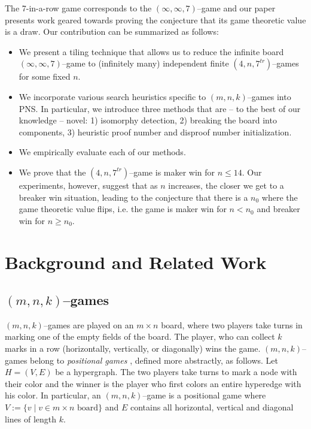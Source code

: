 \documentclass[conference]{IEEEtran}
\theoremstyle{definition}
\begin{document}
The 7-in-a-row game corresponds to the $(\infty, \infty, 7)$--game and our paper presents work geared towards proving the conjecture that its game theoretic value is a draw. Our contribution can be summarized as follows:
\begin{itemize}
    \item We present a tiling technique that allows us to reduce the infinite board $(\infty,\infty,7)$--game to (infinitely many) independent finite $(4,n,7^{tr})$--games for some fixed $n$.
    \item We incorporate various search heuristics specific to $(m,n,k)$--games into PNS. In particular, we introduce three methods that are -- to the best of our knowledge -- novel: 1) isomorphy detection, 2) breaking the board into components, 3) heuristic proof number and disproof number initialization.
    \item  We empirically evaluate each of our methods.
    \item We prove that the $(4,n,7^{tr})$--game is maker win for $n \leq 14$. Our experiments, however, suggest that as $n$ increases, the closer we get to a breaker win situation, leading to the conjecture that there is a $n_0$ where the game theoretic value flips, i.e. the game is maker win for $n < n_0$ and breaker win for $n \geq n_0$.
\end{itemize}



\section{Background and Related Work}
\label{sec:background}

\subsection{$(m,n,k)$--games}
$(m,n,k)$--games are played on an $m \times n$ board, where two players take turns in marking one of the empty fields of the board. The player, who can collect $k$ marks in a row (horizontally, vertically, or diagonally) wins the game. $(m,n,k)$--games belong to \emph{positional games} \cite{BECK1981117}, defined more abstractly, as follows. Let $H=(V,E)$ be a hypergraph. The two players take turns to mark a node with their color and the winner is the player who first colors an entire hyperedge with his color. In particular, an $(m,n,k)$--game is a positional game where $V:=\{v \mid v \in m \times n \text{ board}\}$ and $E$ contains all horizontal, vertical and diagonal lines of length $k$. 
\end{document}
